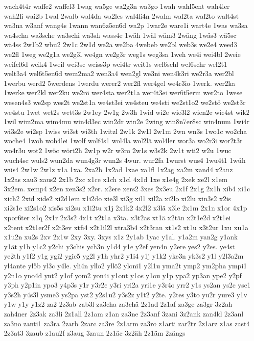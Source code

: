 {wach4t4r
waffe2
waffel3
1wag
wa5ge
wa2g3n
wa3go
1wah
wahl5ent
wah4ler
wah2li
wai2b
1wal
2walb
wal4da
wa2les
wal4li4n
2walm
wal2ta
wal2to
walt4st
wa3na
w3anf
wang4s
1wann
wan6z5en6d
wa2p
1war2e
ware1i
wart4e
1was
wa3sa
wa4scha
wa3sche
wa3schi
wa3sh
wass4e
1wäh
1wäl
wäm3
2wäng
1wäs3
wä5sc
wä4ss
2w1b2
wbu2
2w1c
2w1d
we2a
we2ba
4webeb
we2bl
web3s
we2e4
weed3
we2fl
1weg
we2g1a
we2g3l
we4gn
we2g3r
weg1s
weg3sa
1weh
we4i
wei4bl
2weie
weifel6d
weik4
1weil
wei3sc
weiss3p
wei4tr
weit1s
wel6schl
wel6schr
wel2t1
welt3a4
wel6t5en6d
wem2ma2
wen3a4
wen2gl
we3ni
wen4k3ri
we2r3a
wer2bl
1werbu
werd2
5werdens
1werdu
werer2
wer2fl
wer4gel
we4r3io
1werk.
wer2ka
1werke
wer2kl
wer2ku
we2rö
wer4sta
wer2t1a
wer4t3ei
wer6t5erm
wer2to
1wese
wesen4s3
we2sp
wes2t
we2st1a
we4st3ei
we4steu
we4sti
we2st1o2
we2stö
we2st3r
we4stu
1wet
wet2s
wett3s
2w1ey
2w1g
2w3h
1wid
wi2e
wie3l2
wien2e
wie4st
wik2
1wil
wim2ma
wim4mu
win4d3ec
win2dr
win2e
2wing
win8n7er8sc
win4num
1wi4r
wi3s2e
wi2sp
1wiss
wi3st
wi3th
1witzl
2w1k
2w1l
2w1m
2wn
wn3s
1wo1c
wo2cha
woche4
1woh
woh4lei
1wolf
wolf4s1
wol4la
wol2lä
wol4ler
wor3a
wo2r3i
wor2t3r
wo4r3u
wot2
1wöc
wört2h
2w1p
w2r
w3ro
2w1s
w3s2k
2w1t
wti2
w2u
1wuc
wuch4sc
wuls2
wun2da
wun4g3r
wun2s
4wur.
wur2fa
1wurst
wus4
1wu4t1
1wüh
wüs4
2w1w
2w1z
x1a
1xa.
2xa2b
1x2ad
1xae
xa1fl
1x2ag
xa2m
xand4
x2anz
1x2as
xau3
xaus2
2x1b
2xc
x1ce
x1ch
x1cl
4x1d
1xe
x1e4g
2xek
xe2l
x1em
3x2em.
xemp4
x2en
xen3s2
x2er.
x2ere
xers2
3xes
2x3eu
2x1f
2x1g
2x1h
xib4
xi1c
xich2
2xid
xide2
xi2d1em
x1i2do
xie3l
xi3g
xil1
xil2a
xi2lo
xi2lu
xin3s2
x2is
xi2s1e
xi2s1o2
xis5s
xi2su
x1i2tu
x1j
2x1k2
4x2l2
x3lä
x3le
2x1m
2x1n
x1or
4x1p
xpor6ter
x1q
2x1r
2x3s2
4x1t
x2t1a
x3ta.
x3t2as
xt1ä
x2tän
x2t1e2d
x2t1ei
x2tent
x2t1er2f
x2t3ev
xtfi4
x2t1il2l
xtra3b4
x2t3ran
xt1s2
xt1u
x3t2ur
1xu
xu1a
x1u2n
xu2s
2xv
2x1w
2xy
3xy.
3xys
x1z
2y1ab
1yac
y1al.
y1a2m
yan2g
y1ank
y1ät
y1b
y1c2
y2chi
y3chis
ych3n
y1d4
y1e
y2ef
yen4n
y2ere
yes2
y2es.
ye4st
ye2th
y1f2
y1g
ygi2
ygie5
yg2l
y1h
yhr2
y1i4
y1j
y1k2
yke3n
yk3s2
y1l
y2l3a2m
yl4ante
yl5b
yl3c
y4le.
yli4n
yllo2
yllö2
yloni1
y2l1u
yma2t
ymp2
ym2pha
ympi1
y2n1o
yno4d
ynt2
y1of
yom2
yon4i
y1ont
y1os
y1ou
y1p
ypa2
yp3an
ype2
y2pf
y3ph
y2p1in
ypo3
y4p3s
y1r
y3r2e
y3ri
yri2a
yri1e
y3r4o
yrr2
y1s
ys2an
ys2c
yse1
y3s2h
y4s3l
ysme3
ys2pa
yst2
y2s1u2
y3s2z
y1t2
y2te.
y2tes
y3to
yu2r
yure3
y1v
y1w
y1y
y1z2
za2
2z3ab
zab3l
za3cha
za3chä
2z1ad
2z1af
za3ge
za3gr
3z2ah
zah4ner
2z3ak
za3li
2z1all
2z1am
z1an
za3ne
2z3anf
3zani
3z2ank
zan4kl
2z3anl
za3no
zanti1
za3ra
2zarb
2zarc
za3re
2z1arm
za3ro
z1arti
zar2tr
2z1arz
z1as
zast4
2z3at3
3zaub
z1au2f
z3aug
3zaun
2z1äc
3z2äh
2z1äm
2zängs
}

